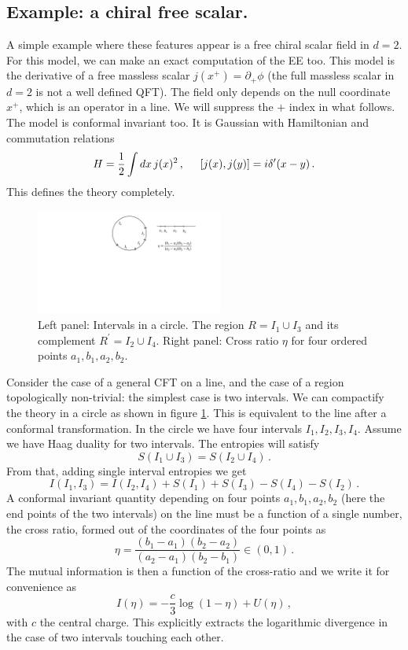 \documentclass[12pt]{article}
\numberwithin{equation}{section}
\newcommand{\be}{\begin{equation}}
\newcommand{\ee}{\end{equation}}
\begin{document}
\subsection{Example: a chiral free scalar.}
A simple example where these features appear is a free chiral scalar field in $d=2$. For this model, we can make an exact computation of the EE too. This model is the derivative of a free massless scalar $j(x^+)=\partial_+ \phi$ (the full massless scalar in $d=2$ is not a well defined QFT). The field only depends on the null coordinate $x^+$, which is an operator in a line. We will suppress the $+$ index in what follows. The model is conformal invariant too. It is Gaussian with Hamiltonian and  commutation relations  
\be
H=\frac{1}{2}\int dx\, j(x)^2\,,\hspace{.5cm} [j(x),j(y)]=i\delta'(x-y)\,.\label{conr}
\ee
This defines the theory completely. 

\begin{figure}[t]
\begin{center}  
\includegraphics[width=0.55\textwidth]{dualityexample2.pdf}
\captionsetup{width=0.9\textwidth}
\caption{Left panel: Intervals in a circle. The region $R=I_1\cup I_3$ and its complement $R^{\prime}=I_2\cup I_4$. 
Right panel: Cross ratio $\eta$ for four ordered points $a_1,b_1,a_2,b_2$.}
\label{dualityexample}
\end{center}  
\end{figure}   


Consider the case of a general CFT on a line, and the case of a region topologically non-trivial: the simplest case is two intervals. We can compactify the theory in a circle as shown in figure \ref{dualityexample}. This is equivalent to the line after a conformal transformation. In the circle we have four intervals $I_1,I_2,I_3,I_4$. Assume we have Haag duality for two intervals. The entropies will satisfy 
\be
S(I_1\cup I_3)=S(I_2\cup I_4)\,.\label{iden}
\ee
From that, adding single interval entropies we get
\be
 I(I_1,I_3)=I(I_2,I_4)+S(I_1)+S(I_3)-S(I_4)-S(I_2)\,.
 \label{1.13}
\ee
A conformal invariant quantity depending on four points $a_1,b_1,a_2,b_2$ (here the end points of the two intervals) on the line must be a function of a single number, the cross ratio, formed out of the coordinates of the four points as
\be
\eta=\frac{(b_1-a_1)(b_2-a_2)}{(a_2-a_1)(b_2-b_1)}\in(0,1)\,.
\ee
The mutual information is then a function of the cross-ratio and we write it for convenience as 
\be
I(\eta)=-\frac{c}{3} \log(1-\eta)+U(\eta)\,,\label{uu}
\ee
with $c$ the central charge. This explicitly extracts the logarithmic divergence in the case of two intervals touching each other. 
\end{document}
